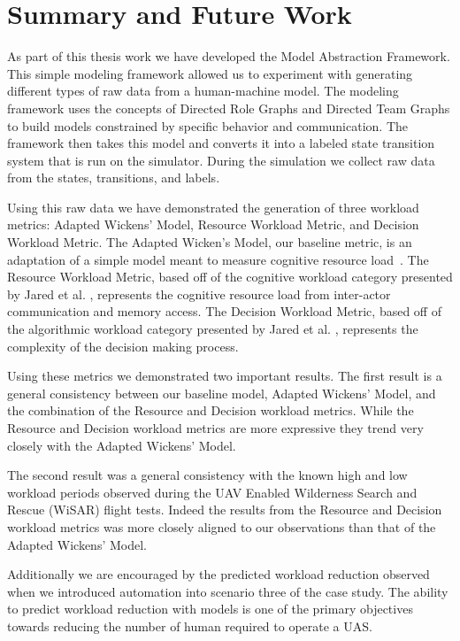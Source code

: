 \chapter{Summary and Future Work}

As part of this thesis work we have developed the Model Abstraction Framework.  This simple modeling framework allowed us to experiment with generating different types of raw data from a human-machine model.  The modeling framework uses the concepts of Directed Role Graphs and Directed Team Graphs to build models constrained by specific behavior and communication.  The framework then takes this model and converts it into a labeled state transition system that is run on the simulator.  During the simulation we collect raw data from the states, transitions, and labels.

Using this raw data we have demonstrated the generation of three workload metrics: Adapted Wickens' Model, Resource Workload Metric, and Decision Workload Metric.  The Adapted Wicken's Model, our baseline metric, is an adaptation of a simple model meant to measure cognitive resource load~\cite{wickens2002multiple}.  The Resource Workload Metric, based off of the cognitive workload category presented by Jared et al. \cite{moore2014modeling}, represents the cognitive resource load from inter-actor communication and memory access.  The Decision Workload Metric, based off of the algorithmic workload category presented by Jared et al. \cite{moore2014modeling}, represents the complexity of the decision making process.

Using these metrics we demonstrated two important results.  The first result is a general consistency between our baseline model, Adapted Wickens' Model, and the combination of the Resource and Decision workload metrics.  While the Resource and Decision workload metrics are more expressive they trend very closely with the Adapted Wickens' Model.

The second result was a general consistency with the known high and low workload periods observed during the UAV Enabled Wilderness Search and Rescue (WiSAR) flight tests.  Indeed the results from the Resource and Decision workload metrics was more closely aligned to our observations than that of the Adapted Wickens' Model.

Additionally we are encouraged by the predicted workload reduction observed when we introduced automation into scenario three of the case study.  The ability to predict workload reduction with models is one of the primary objectives towards reducing the number of human required to operate a UAS.

